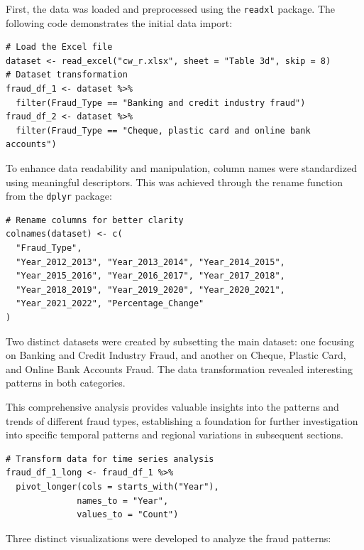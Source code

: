 \documentclass{article}
\begin{document}
First, the data was loaded and preprocessed using the \texttt{readxl} package. The following code demonstrates the initial data import:

\begin{lstlisting}[style=RStyle, caption={Initial Data Import and Transformation}]
# Load the Excel file
dataset <- read_excel("cw_r.xlsx", sheet = "Table 3d", skip = 8)
# Dataset transformation
fraud_df_1 <- dataset %>% 
  filter(Fraud_Type == "Banking and credit industry fraud")
fraud_df_2 <- dataset %>%
  filter(Fraud_Type == "Cheque, plastic card and online bank accounts")
\end{lstlisting}

To enhance data readability and manipulation, column names were standardized using meaningful descriptors. This was achieved through the rename function from the \texttt{dplyr} package:

\begin{lstlisting}[style=RStyle, caption={Column Name Standardization}]
# Rename columns for better clarity
colnames(dataset) <- c(
  "Fraud_Type",
  "Year_2012_2013", "Year_2013_2014", "Year_2014_2015",
  "Year_2015_2016", "Year_2016_2017", "Year_2017_2018",
  "Year_2018_2019", "Year_2019_2020", "Year_2020_2021",
  "Year_2021_2022", "Percentage_Change"
)
\end{lstlisting}

Two distinct datasets were created by subsetting the main dataset: one focusing on Banking and Credit Industry Fraud, and another on Cheque, Plastic Card, and Online Bank Accounts Fraud. The data transformation revealed interesting patterns in both categories.

This comprehensive analysis provides valuable insights into the patterns and trends of different fraud types, establishing a foundation for further investigation into specific temporal patterns and regional variations in subsequent sections.

\begin{lstlisting}[style=RStyle, caption={Time Series Data Transformation}]
# Transform data for time series analysis
fraud_df_1_long <- fraud_df_1 %>%
  pivot_longer(cols = starts_with("Year"),
              names_to = "Year",
              values_to = "Count")
\end{lstlisting}

Three distinct visualizations were developed to analyze the fraud patterns:
\end{document}
